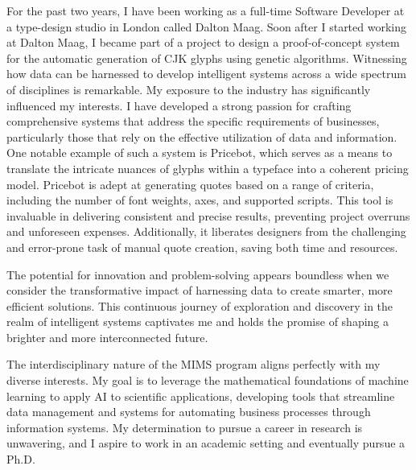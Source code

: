 \documentclass[11pt]{article}
\begin{document}
For the past two years, I have been working as a full-time Software Developer at
a type-design studio in London called Dalton Maag. Soon after I started working
at Dalton Maag, I became part of a project to design a proof-of-concept system
for the automatic generation of CJK glyphs using genetic algorithms. Witnessing
how data can be harnessed to develop intelligent systems across a wide spectrum
of disciplines is remarkable. My exposure to the industry has significantly
influenced my interests. I have developed a strong passion for crafting
comprehensive systems that address the specific requirements of businesses,
particularly those that rely on the effective utilization of data and
information. One notable example of such a system is Pricebot, which serves as a
means to translate the intricate nuances of glyphs within a typeface into a
coherent pricing model. Pricebot is adept at generating quotes based on a range
of criteria, including the number of font weights, axes, and supported scripts.
This tool is invaluable in delivering consistent and precise results, preventing
project overruns and unforeseen expenses. Additionally, it liberates designers
from the challenging and error-prone task of manual quote creation, saving both
time and resources.

The potential for innovation and problem-solving appears boundless when we
consider the transformative impact of harnessing data to create smarter, more
efficient solutions. This continuous journey of exploration and discovery in the
realm of intelligent systems captivates me and holds the promise of shaping a
brighter and more interconnected future.

The interdisciplinary nature of the MIMS program aligns perfectly with my
diverse interests. My goal is to leverage the mathematical foundations of
machine learning to apply AI to scientific applications, developing tools that
streamline data management and systems for automating business processes through
information systems. My determination to pursue a career in research is
unwavering, and I aspire to work in an academic setting and eventually pursue a
Ph.D.
\end{document}
